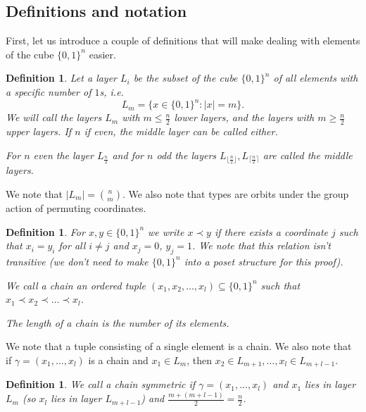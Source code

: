 \documentclass[11pt, reqno]{amsart}
\newtheorem{definition}[theorem]{Definition}
\numberwithin{equation}{section}
\begin{document}
\subsection{Definitions and notation}

First, let us introduce a couple of definitions that will make dealing with elements of the cube $\{0, 1\}^n$ easier.

\begin{definition}
    Let a \emph{layer} $L_i$ be the subset of the cube $\{0, 1\}^n$ of all elements with a specific number of $1$s, i.e.
    \begin{equation*}
        L_m=\Big\{ x \in \{0, 1\}^n: |x|=m \Big\}.
    \end{equation*}
    We will call the layers $L_m$ with $m \leqslant \frac{n}{2}$ \emph{lower layers,} and the layers with $m \geqslant \frac{n}{2}$ \emph{upper layers.} If $n$ if even, the middle layer can be called either.

    For $n$ even the layer $L_{\frac{n}{2}}$ and for $n$ odd the layers $L_{\lfloor \frac{n}{2} \rfloor}, L_{\lceil \frac{n}{2} \rceil}$ are called the \emph{middle layers.}
\end{definition}

We note that $|L_m|=\binom{n}{m}$. We also note that types are orbits under the group action of permuting coordinates.

\begin{definition}
    For $x, y \in \{0, 1\}^n$ we write $x \prec y$ if there exists a coordinate $j$ such that $x_i=y_i$ for all $i \neq j$ and $x_j=0$, $y_j=1$. We note that this relation isn't transitive (we don't need to make $\{0, 1\}^n$ into a poset structure for this proof).

    We call a \emph{chain} an ordered tuple $(x_1, x_2, \dots, x_l) \subseteq \{0, 1\}^n$ such that $x_1 \prec x_2 \prec \dots \prec x_l$.

    The \emph{length} of a chain is the number of its elements.
\end{definition}

We note that a tuple consisting of a single element is a chain. We also note that if $\gamma=(x_1, \dots, x_l)$ is a chain and $x_1 \in L_m$, then $x_2 \in L_{m+1}, \dots, x_l \in L_{m+l-1}$.

\begin{definition}
    We call a chain \emph{symmetric} if $\gamma=(x_1, \dots, x_l)$ and $x_1$ lies in layer $L_m$ (so $x_l$ lies in layer $L_{m+l-1}$) and $\frac{m+(m+l-1)}{2}=\frac{n}{2}$.
\end{definition}
\end{document}

